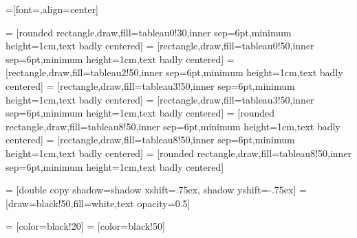 
=[font=\sffamily,align=center]

 = [rounded rectangle,draw,fill=tableau0!30,inner sep=6pt,minimum height=1cm,text badly centered]
 = [rectangle,draw,fill=tableau0!50,inner sep=6pt,minimum height=1cm,text badly centered]
 = [rectangle,draw,fill=tableau2!50,inner sep=6pt,minimum height=1cm,text badly centered]
 = [rectangle,draw,fill=tableau3!50,inner sep=6pt,minimum height=1cm,text badly centered]
 = [rectangle,draw,fill=tableau3!50,inner sep=6pt,minimum height=1cm,text badly centered]
 = [rounded rectangle,draw,fill=tableau8!50,inner sep=6pt,minimum height=1cm,text badly centered]
 = [rectangle,draw,fill=tableau8!50,inner sep=6pt,minimum height=1cm,text badly centered]
 = [rounded rectangle,draw,fill=tableau8!50,inner sep=6pt,minimum height=1cm,text badly centered]

 = [double copy shadow={shadow xshift=.75ex, shadow yshift=-.75ex}]
 = [draw=black!50,fill=white,text opacity=0.5]

 = [color=black!20]
 = [color=black!50]


